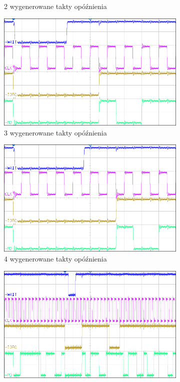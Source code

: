 \documentclass[fleqn]{article}
\begin{document}
\begin{figure}[H]
\begin{subfigure}[b]{0.49\textwidth}
		\caption{2 wygenerowane takty opóźnienia}
		\label{fig:2c}
	\end{subfigure}
	\begin{subfigure}[b]{0.49\textwidth}
		\includegraphics[width=\textwidth]{img/2d.png}
		\caption{3 wygenerowane takty opóźnienia}
		\label{fig:2d}
	\end{subfigure}
	\begin{subfigure}[b]{0.49\textwidth}
		\includegraphics[width=\textwidth]{img/2e.png}
		\caption{4 wygenerowane takty opóźnienia}
		\label{fig:2e}
	\end{subfigure}
	\begin{subfigure}[b]{0.49\textwidth}
	\includegraphics[width=\textwidth]{img/2f.png}

\end{subfigure}
\end{figure}
\end{document}
